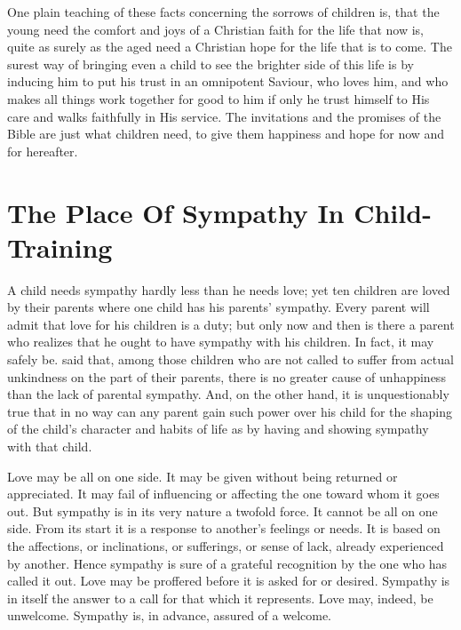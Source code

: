 \documentclass[
]{book}
\begin{document}
One plain teaching of these facts concerning the sorrows of children is, that the young need the comfort and joys of a Christian faith for the life that now is, quite as surely as the aged need a Christian hope for the life that is to come. The surest way of bringing even a child to see the brighter side of this life is by inducing him to put his trust in an omnipotent Saviour, who loves him, and who makes all things work together for good to him if only he trust himself to His care and walks faithfully in His service. The invitations and the promises of the Bible are just what children need, to give them happiness and hope for now and for hereafter.

\hypertarget{the-place-of-sympathy-in-child-training}{%
\chapter{The Place Of Sympathy In Child-Training}\label{the-place-of-sympathy-in-child-training}}

A child needs sympathy hardly less than he needs love; yet ten children are loved by their parents where one child has his parents' sympathy. Every parent will admit that love for his children is a duty; but only now and then is there a parent who realizes that he ought to have sympathy with his children. In fact, it may safely be. said that, among those children who are not called to suffer from actual unkindness on the part of their parents, there is no greater cause of unhappiness than the lack of parental sympathy. And, on the other hand, it is unquestionably true that in no way can any parent gain such power over his child for the shaping of the child's character and habits of life as by having and showing sympathy with that child.

Love may be all on one side. It may be given without being returned or appreciated. It may fail of influencing or affecting the one toward whom it goes out. But sympathy is in its very nature a twofold force. It cannot be all on one side. From its start it is a response to another's feelings or needs. It is based on the affections, or inclinations, or sufferings, or sense of lack, already experienced by another. Hence sympathy is sure of a grateful recognition by the one who has called it out. Love may be proffered before it is asked for or desired. Sympathy is in itself the answer to a call for that which it represents. Love may, indeed, be unwelcome. Sympathy is, in advance, assured of a welcome.
\end{document}
